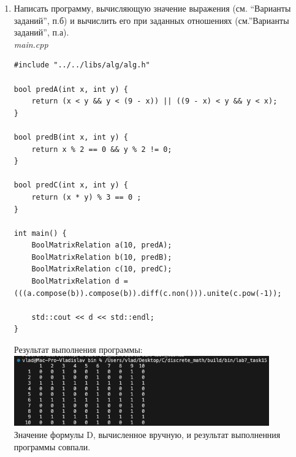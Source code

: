 \documentclass[a4paper,14pt]{extarticle}
\begin{document}
\begin{enumerate}[label=1.\arabic*.]
\begin{verbatim}
	return BoolMatrixRelation(size, [this, &b](int x, int y) {
		return data[x - 1][y - 1] ^ b.data[x - 1][y - 1];
	});
}
BoolMatrixRelation BoolMatrixRelation::non()
{
	return BoolMatrixRelation(size, [this](int x, int y) {
		return !data[x - 1][y - 1];
	});
}
BoolMatrixRelation BoolMatrixRelation::transpose()
{
	return BoolMatrixRelation(size, [this](int x, int y) {
		return data[y - 1][x - 1];
	});
}
BoolMatrixRelation BoolMatrixRelation::compose(BoolMatrixRelation b)
{
	if (this->size != b.size) return BoolMatrixRelation::getDefault();
	
	return BoolMatrixRelation(size, [this, &b](int x, int y) {
		for (int z = 0; z < size; z++) {
			if (data[x - 1][z] && b.data[z][y - 1])
			return true;
		}
		
		return false;
	});
}
BoolMatrixRelation BoolMatrixRelation::pow(int p)
{
	if (p < 0) return transpose();
	if (p == 0) return BoolMatrixRelation(size, [](int x, int y){return x == y;});
	if (p == 1) return *this;
	
	BoolMatrixRelation lowP = pow(p - 1);
	return compose(lowP);
}
\end{verbatim}
	\item Написать программу, вычисляющую значение выражения (см. “Варианты заданий”, п.б) и вычислить его при заданных отношениях (см.”Варианты заданий”, п.а).
	      \\
	      \textit{main.cpp}
	      \begin{verbatim}
#include "../../libs/alg/alg.h"

bool predA(int x, int y) {
	return (x < y && y < (9 - x)) || ((9 - x) < y && y < x);
}

bool predB(int x, int y) {
	return x % 2 == 0 && y % 2 != 0;
}

bool predC(int x, int y) {
	return (x * y) % 3 == 0 ;
}

int main() {
	BoolMatrixRelation a(10, predA);
	BoolMatrixRelation b(10, predB);
	BoolMatrixRelation c(10, predC);
	BoolMatrixRelation d = (((a.compose(b)).compose(b)).diff(c.non())).unite(c.pow(-1));
	
	std::cout << d << std::endl;
}
    \end{verbatim}
	      Результат выполнения программы:\\
	      \includegraphics[width=110mm]{1.5}\\
	      Значение формулы D, вычисленное вручную, и результат выполненния программы совпали.
\end{enumerate}
\end{document}
